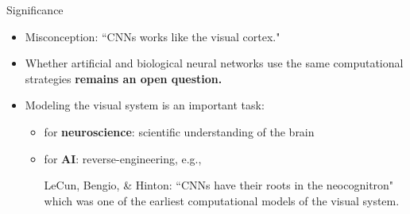 \documentclass[xcolor={dvipsnames,svgnames}]{beamer}
\begin{document}
\begin{frame}{Significance}
\begin{itemize}
    \item Misconception: ``CNNs works like the visual cortex."
    \item Whether artificial and biological neural networks use the same computational strategies \textbf{remains an open question.} \cite{Gwilliams221630}
    \item Modeling the visual system is an important task:
    \begin{itemize}
        \item for \textbf{neuroscience}: scientific understanding of the brain
        \item for \textbf{AI}: reverse-engineering, e.g., 
        
        LeCun, Bengio, \& Hinton: ``CNNs have their roots in the neocognitron" which was one of the earliest computational models of the visual system. \cite{lecun_deep_2015}
    \end{itemize}
\end{itemize}
\end{frame}
\end{document}
